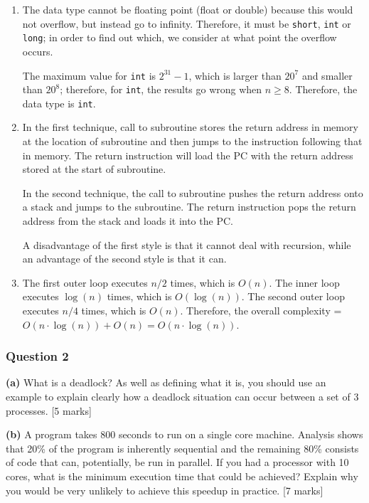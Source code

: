 {\color{blue}
\begin{enumerate}[label=(\alph*)]
    \item The data type cannot be floating point (float or double) because this would not overflow, but instead go to infinity. Therefore, it must be \texttt{short}, \texttt{int} or \texttt{long}; in order to find out which, we consider at what point the overflow occurs.

    The maximum value for \texttt{int} is $2^{31} - 1$, which is larger than $20^7$ and smaller than $20^8$; therefore, for \texttt{int}, the results go wrong when $n \geq 8$. Therefore, the data type is \texttt{int}.
    \item In the first technique, call to subroutine stores the return address in memory at the location of subroutine and then jumps to the instruction following that in memory. The return instruction will load the PC with the return address stored at the start of subroutine.

    In the second technique, the call to subroutine pushes the return address onto a stack and jumps to the subroutine. The return instruction pops the return address from the stack and loads it into the PC.

    A disadvantage of the first style is that it cannot deal with recursion, while an advantage of the second style is that it can.
    \item The first outer loop executes $n/2$ times, which is $O(n)$. The inner loop executes $\log(n)$ times, which is $O(\log(n))$. The second outer loop executes $n/4$ times, which is $O(n)$. Therefore, the overall complexity = $O(n \cdot \log(n)) + O(n) = O(n \cdot \log(n))$.
\end{enumerate}
}
\subsubsection{Question 2}

\textbf{(a)}
What is a deadlock? As well as defining what it is, you should use an example to explain clearly how a deadlock situation can occur between a set of 3 processes. \hfill [5 marks]

\textbf{(b)}
A program takes 800 seconds to run on a single core machine. Analysis shows that 20\% of the program is inherently sequential and the remaining 80\% consists of code that can, potentially, be run in parallel. If you had a processor with 10 cores, what is the minimum execution time that could be achieved? Explain why you would be very unlikely to achieve this speedup in practice. \hfill [7 marks]

